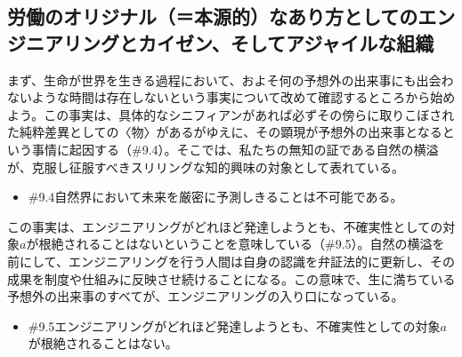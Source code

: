\subsection{労働のオリジナル（＝本源的）なあり方としてのエンジニアリングとカイゼン、そしてアジャイルな組織}\label{ux52b4ux50cdux306eux30aaux30eaux30b8ux30caux30ebux672cux6e90ux7684ux306aux3042ux308aux65b9ux3068ux3057ux3066ux306eux30a8ux30f3ux30b8ux30cbux30a2ux30eaux30f3ux30b0ux3068ux30abux30a4ux30bcux30f3ux305dux3057ux3066ux30a2ux30b8ux30e3ux30a4ux30ebux306aux7d44ux7e54}

まず、生命が世界を生きる過程において、およそ何の予想外の出来事にも出会わないような時間は存在しないという事実について改めて確認するところから始めよう。この事実は、具体的なシニフィアンがあれば必ずその傍らに取りこぼされた純粋差異としての〈物〉があるがゆえに、その顕現が予想外の出来事となるという事情に起因する（\#9.4）。そこでは、私たちの無知の証である自然の横溢が、克服し征服すべきスリリングな知的興味の対象として表れている。

\begin{note}{}
  \begin{itemize}
    \tightlist
    \item{\#9.4}自然界において未来を厳密に予測しきることは不可能である。
  \end{itemize}
\end{note}

この事実は、エンジニアリングがどれほど発達しようとも、不確実性としての対象\(a\)が根絶されることはないということを意味している（\#9.5）。自然の横溢を前にして、エンジニアリングを行う人間は自身の認識を弁証法的に更新し、その成果を制度や仕組みに反映させ続けることになる。この意味で、生に満ちている予想外の出来事のすべてが、エンジニアリングの入り口になっている。

\begin{note}{}
  \begin{itemize}
    \tightlist
    \item{\#9.5}エンジニアリングがどれほど発達しようとも、不確実性としての対象$a$が根絶されることはない。
  \end{itemize}
\end{note}

